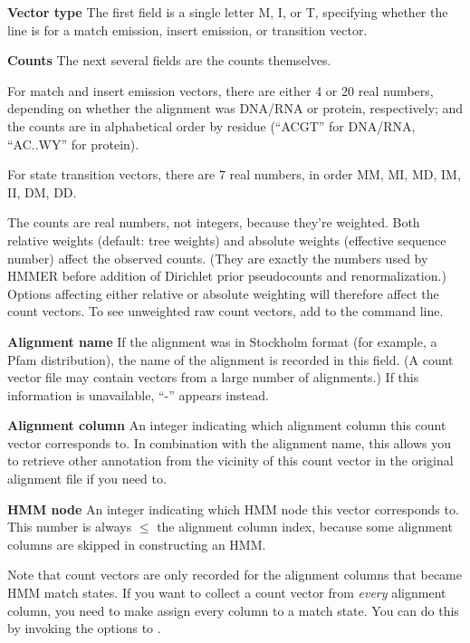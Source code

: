 \begin{wideitem}
\item[\textbf{Vector type}] The first field is a single letter M,
I, or T, specifying whether the line is for a match emission, insert
emission, or transition vector.

\item[\textbf{Counts}] The next several fields are the counts
themselves. 

For match and insert emission vectors, there are either 4 or 20 real
numbers, depending on whether the alignment was DNA/RNA or protein,
respectively; and the counts are in alphabetical order by residue
(``ACGT'' for DNA/RNA, ``AC..WY'' for protein).

For state transition vectors, there are 7 real numbers, in order MM,
MI, MD, IM, II, DM, DD.

The counts are real numbers, not integers, because they're
weighted. Both relative weights (default: tree weights) and absolute
weights (effective sequence number) affect the observed counts. (They
are exactly the numbers used by HMMER before addition of Dirichlet
prior pseudocounts and renormalization.) Options affecting either
relative or absolute weighting will therefore affect the count
vectors. To see unweighted raw count vectors, add  to the  command line.

\item[\textbf{Alignment name}] If the alignment was in Stockholm
format (for example, a Pfam distribution), the name of the alignment
is recorded in this field. (A count vector file may contain vectors
from a large number of alignments.) If this information is
unavailable, ``-'' appears instead.

\item[\textbf{Alignment column}] An integer indicating which alignment
column this count vector corresponds to. In combination with the
alignment name, this allows you to retrieve other annotation from the
vicinity of this count vector in the original alignment file if you
need to.

\item[\textbf{HMM node}] An integer indicating which HMM node this
vector corresponds to. This number is always $\leq$ the alignment
column index, because some alignment columns are skipped in
constructing an HMM. 

Note that count vectors are only recorded for the alignment columns
that became HMM match states. If you want to collect a count vector
from \emph{every} alignment column, you need to make 
assign every column to a match state. You can do this by invoking the
 options to .


\end{wideitem}
